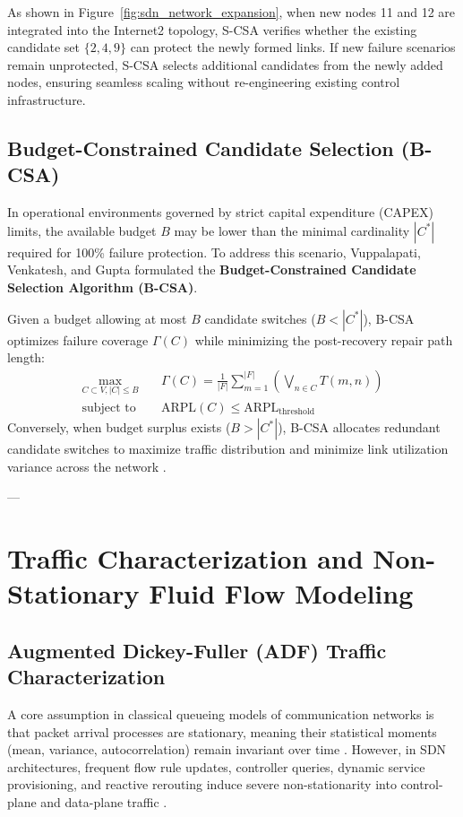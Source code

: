 As shown in Figure~\ref{fig:sdn_network_expansion}, when new nodes 11 and 12 are integrated into the Internet2 topology, S-CSA verifies whether the existing candidate set $\{2, 4, 9\}$ can protect the newly formed links. If new failure scenarios remain unprotected, S-CSA selects additional candidates from the newly added nodes, ensuring seamless scaling without re-engineering existing control infrastructure.

\subsection{Budget-Constrained Candidate Selection (B-CSA)}
In operational environments governed by strict capital expenditure (CAPEX) limits, the available budget $B$ may be lower than the minimal cardinality $|C^*|$ required for 100\% failure protection. To address this scenario, Vuppalapati, Venkatesh, and Gupta \cite{vuppalapati2022gcaiot, vuppalapati2025candidate} formulated the \textbf{Budget-Constrained Candidate Selection Algorithm (B-CSA)}.

Given a budget allowing at most $B$ candidate switches ($B < |C^*|$), B-CSA optimizes failure coverage $\Gamma(C)$ while minimizing the post-recovery repair path length:
\begin{align}
    \max_{C \subset V, |C| \le B} \quad & \Gamma(C) = \frac{1}{|F|} \sum_{m=1}^{|F|} \left( \bigvee_{n \in C} T(m, n) \right) \\
    \text{subject to} \quad & \text{ARPL}(C) \le \text{ARPL}_{\text{threshold}}
\end{align}
Conversely, when budget surplus exists ($B > |C^*|$), B-CSA allocates redundant candidate switches to maximize traffic distribution and minimize link utilization variance across the network \cite{vuppalapati2022gcaiot}.

---

\section{Traffic Characterization and Non-Stationary Fluid Flow Modeling}
\label{sec:sdn_nonstationary}

\subsection{Augmented Dickey-Fuller (ADF) Traffic Characterization}
A core assumption in classical queueing models of communication networks is that packet arrival processes are stationary, meaning their statistical moments (mean, variance, autocorrelation) remain invariant over time \cite{gross2018fundamentals, kleinrock1975queueing1}. However, in SDN architectures, frequent flow rule updates, controller queries, dynamic service provisioning, and reactive rerouting induce severe non-stationarity into control-plane and data-plane traffic \cite{vuppalapati2021modeling, vuppalapati2020icacce}.

